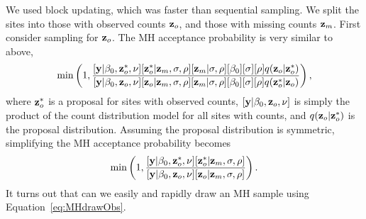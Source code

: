 \documentclass[11pt, titlepage]{article}
\begin{document}
\begin{flushleft}
\begin{onehalfspace}
We used block updating, which was faster than sequential sampling. We split the sites into those with observed counts $\mathbf{z}_{o}$, and those with missing counts $\mathbf{z}_{m}$. First consider sampling for $\mathbf{z}_{o}$. The MH acceptance probability is very similar to above,
\begin{equation} \label{eq:MHblock}
\min\left(1,\frac{[\mathbf{y}|\beta_{0},\mathbf{z}^{*}_{o},\nu][\mathbf{z}^{*}_{o}|\mathbf{z}_{m},\sigma,\rho][\mathbf{z}_{m}|\sigma,\rho][\beta_{0}] [\sigma] [\rho]q(\mathbf{z}_{o}|\mathbf{z}_{o}^{*})}
	{[\mathbf{y}|\beta_{0},\mathbf{z}_{o},\nu][\mathbf{z}_{o}|\mathbf{z}_{m},\sigma,\rho][\mathbf{z}_{m}|\sigma,\rho][\beta_{0}] [\sigma] [\rho]q(\mathbf{z}_{o}^{*}|\mathbf{z}_{o})}\right),
\end{equation}
where $\mathbf{z}^{*}_{o}$ is a proposal for sites with observed counts, $[\mathbf{y}|\beta_{0},\mathbf{z}_{o},\nu]$ is simply the product of the count distribution model for all sites with counts, and $q(\mathbf{z}_{o}|\mathbf{z}_{o}^{*})$ is the proposal distribution. Assuming the proposal distribution is symmetric, simplifying the MH acceptance probability becomes
\begin{equation}\label{eq:MHdrawObs}
\min\left(1,\frac{[\mathbf{y}|\beta_{0},\mathbf{z}^{*}_{o},\nu][\mathbf{z}^{*}_{o}|\mathbf{z}_{m},\sigma,\rho]}
	{[\mathbf{y}|\beta_{0},\mathbf{z}_{o},\nu][\mathbf{z}_{o}|\mathbf{z}_{m},\sigma,\rho]}\right).
\end{equation}
It turns out that can we easily and rapidly draw an MH sample using Equation~\eqref{eq:MHdrawObs}.  


\end{onehalfspace}
\end{flushleft}
\end{document}
